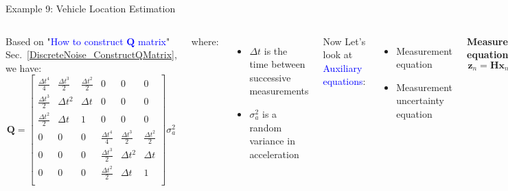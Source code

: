 \begin{frame}{Example 9: Vehicle Location Estimation}
\begin{columns}
Based on "\textcolor{blue}{How to construct $\mathbf{Q}$ matrix}" Sec.~\ref{DiscreteNoise_ConstructQMatrix}, we have:        
\[
\mathbf{Q} =
\begin{bmatrix}
\frac{\Delta t^4}{4} & \frac{\Delta t^3}{2} & \frac{\Delta t^2}{2} & 0 & 0 & 0 \\
\frac{\Delta t^3}{2} & \Delta t^2 & \Delta t & 0 & 0 & 0 \\
\frac{\Delta t^2}{2} & \Delta t & 1 & 0 & 0 & 0 \\
0 & 0 & 0 & \frac{\Delta t^4}{4} & \frac{\Delta t^3}{2} & \frac{\Delta t^2}{2} \\
0 & 0 & 0 & \frac{\Delta t^3}{2} & \Delta t^2 & \Delta t \\
0 & 0 & 0 & \frac{\Delta t^2}{2} & \Delta t & 1 \\
\end{bmatrix}\sigma_a^2
\]

where:
\begin{itemize}
    \item $\Delta t$ is the time between successive measurements
    \item $\sigma_a^2$ is a random variance in acceleration
\end{itemize}

Now Let's look at \textcolor{blue}{Auxiliary equations}:
\begin{itemize}
    \item Measurement equation
    \item Measurement uncertainty equation
\end{itemize}

        \textbf{Measurement equation}
        \begin{equation*}
        \mathbf{z}_n = \mathbf{H}\mathbf{x}_n + \mathbf{v}_n
        \end{equation*}

        The only measurements provided to us are $X$ and $Y$ coordinates of the vehicle.
        \[
        \mathbf{z}_n =
        \begin{bmatrix}
        x_{n,\text{measured}} \\
        y_{n,\text{measured}}
        \end{bmatrix}
        =
        \mathbf{H}
        \begin{bmatrix}
        x_n \\
        \dot{x}_n \\
        \ddot{x}_n \\
        y_n \\
        \dot{y}_n \\
        \ddot{y}_n
        \end{bmatrix}
        \]


\end{columns}
\end{frame}

